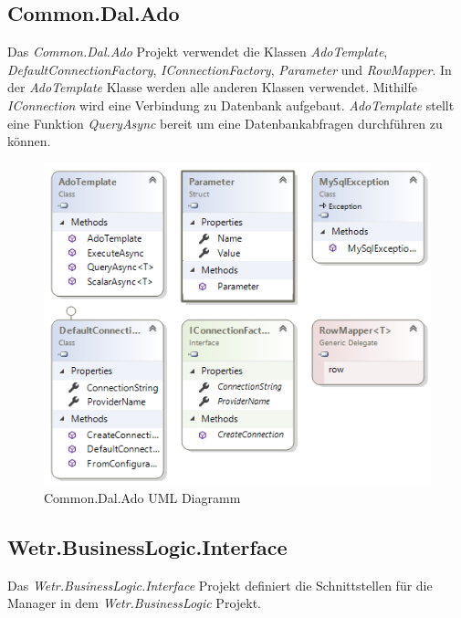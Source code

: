 \newpage
\subsection{Common.Dal.Ado}
Das \textit{Common.Dal.Ado} Projekt verwendet die Klassen \textit{AdoTemplate}, \textit{DefaultConnectionFactory}, \textit{IConnectionFactory}, \textit{Parameter} und  \textit{RowMapper}. In der  \textit{AdoTemplate} Klasse werden alle anderen Klassen verwendet. Mithilfe  \textit{IConnection} wird eine Verbindung zu Datenbank aufgebaut.  \textit{AdoTemplate} stellt eine Funktion  \textit{QueryAsync} bereit um eine Datenbankabfragen durchführen zu können.

\begin{figure}[H]
\centering
\includegraphics[width=.8\textwidth]{pictures/Common_Dal_Ado_ClassDiagramm.png}
\caption{Common.Dal.Ado UML Diagramm}
\label{fig:common.dal.ado}
\end{figure}
\raggedright

\newpage
\subsection{Wetr.BusinessLogic.Interface}
Das \textit{Wetr.BusinessLogic.Interface} Projekt definiert die Schnittstellen für die Manager in dem \textit{Wetr.BusinessLogic} Projekt.

